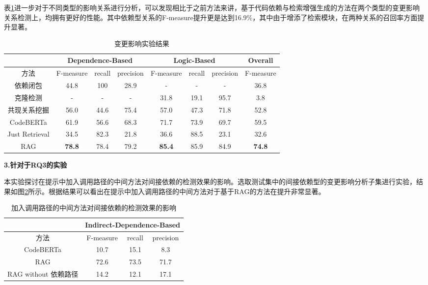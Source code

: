 表\ref{2_变更影响实验结果}进一步对于不同类型的影响关系进行分析，可以发现相比于之前方法来讲，基于代码依赖与检索增强生成的方法在两个类型的变更影响关系检测上，均拥有更好的性能。其中依赖型关系的F-measure提升更是达到16.9\%，其中由于增添了检索模块，在两种关系的召回率方面提升显著。

\begin{table}[htbp]
\caption{变更影响实验结果}
\label{2_变更影响实验结果}
\vspace{0.5em}\centering\wuhao
\begin{tabular}{c|ccc|ccc|c}
\toprule
  & \multicolumn{3}{c|}{Dependence-Based} & \multicolumn{3}{c|}{Logic-Based} & Overall \\
\midrule
方法 & F-measure & recall & precision & F-measure & recall & precision  
 & F-measure\\
\midrule
依赖闭包 &  44.8 & 100 & 28.9 & - & - & - & 36.8 \\
克隆检测 &  - & - & - & 31.8 & 19.1 & 95.7 & 3.8\\
共现关系挖掘 &  56.0 & 44.6 & 75.4 & 57.0 & 47.3 & 71.8 & 52.8\\
CodeBERTa  &   61.9 & 56.6 & 68.3 & 71.7 & 73.9 & 69.7 &59.5\\
Just Retrieval   & 34.5 & 82.3 & 21.8 & 36.6 & 88.5 & 23.1 & 32.6\\
RAG & \textbf{78.8} & 78.4 & 79.2 & \textbf{85.4} & 85.9 & 84.9 & \textbf{74.8}\\
\bottomrule
\end{tabular}
\end{table}

\textbf{3.针对于RQ3的实验}

本实验探讨在提示中加入调用路径的中间方法对间接依赖的检测效果的影响。选取测试集中的间接依赖型的变更影响分析子集进行实验，结果如图\ref{2_消融实验}所示。根据结果可以看出在提示中加入调用路径的中间方法对于基于RAG的方法在提升非常显著。

\begin{table}[htbp]
\caption{加入调用路径的中间方法对间接依赖的检测效果的影响}
\label{2_消融实验}
\vspace{0.5em}\centering\wuhao
\begin{tabular}{cccc }
\toprule
  & \multicolumn{3}{c}{Indirect-Dependence-Based}  \\
\midrule
方法 & F-measure & recall & precision \\  
\midrule
CodeBERTa  &  10.7 & 15.1 & 8.3 \\
\midrule
RAG  & 72.6 & 73.5 & 71.7 \\
RAG without 依赖路径  & 14.2 & 12.1 & 17.1 \\
\bottomrule
\end{tabular}
\end{table}


